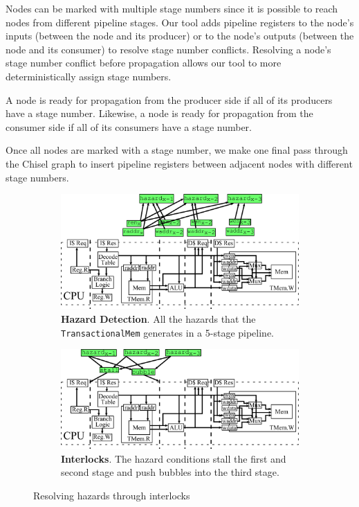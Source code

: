 Nodes can be marked with multiple stage numbers since it is possible to
reach nodes from different pipeline stages. Our tool adds pipeline
registers to the node's inputs (between the node and its producer) or
to the node's outputs (between the node and its consumer) to resolve
stage number conflicts. Resolving a node's stage number conflict
before propagation allows our tool to more deterministically assign
stage numbers.

A node is ready for propagation from the producer side if all of its
producers have a stage number. Likewise, a node is ready for
propagation from the consumer side if all of its consumers have a
stage number.

Once all nodes are marked with a stage number, we make one final pass
through the Chisel graph to insert pipeline registers between adjacent
nodes with different stage numbers.

\begin{figure}[htb]
\centering
  \begin{subfigure}[t]{0.8\textwidth}
  \centering
  \includegraphics[width=\textwidth]{figures/pipelinehazard.pdf}
  \caption{{\bf Hazard Detection}. All the hazards that
    the {\tt TransactionalMem} generates in a 5-stage pipeline.}
  \label{fig:haz}
  \end{subfigure}
  \begin{subfigure}[t]{0.8\textwidth}
  \vspace{20pt}
  \centering
  \includegraphics[width=\textwidth]{figures/pipelineinterlock.pdf}
  \caption{{\bf Interlocks}. The hazard conditions stall the
  first and second stage and push bubbles into the third stage.}
  \label{fig:int}
  \end{subfigure}
\caption{Resolving hazards through interlocks}
\label{fig:hazint}
\end{figure}

